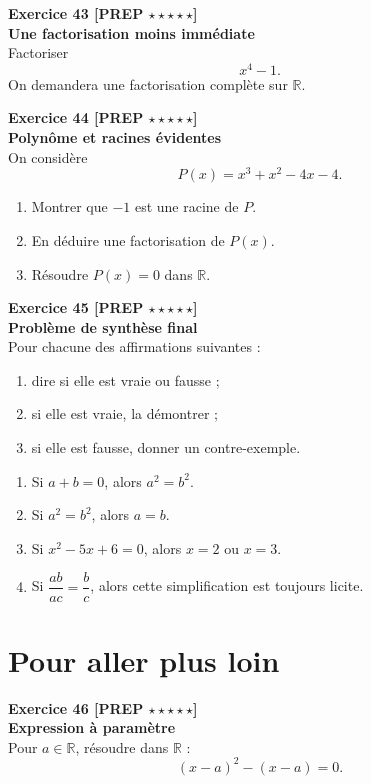\documentclass[11pt,a4paper]{article}
\begin{document}
\textbf{Exercice 43 [PREP $\star\star\star\star\star$]}\\
\textbf{Une factorisation moins immédiate}\\
Factoriser
\[
x^4-1.
\]
On demandera une factorisation complète sur $\mathbb{R}$.

\textbf{Exercice 44 [PREP $\star\star\star\star\star$]}\\
\textbf{Polynôme et racines évidentes}\\
On considère
\[
P(x)=x^3+x^2-4x-4.
\]
\begin{enumerate}[label=\alph*)]
    \item Montrer que $-1$ est une racine de $P$.
    \item En déduire une factorisation de $P(x)$.
    \item Résoudre $P(x)=0$ dans $\mathbb{R}$.
\end{enumerate}

\textbf{Exercice 45 [PREP $\star\star\star\star\star$]}\\
\textbf{Problème de synthèse final}\\
Pour chacune des affirmations suivantes :
\begin{enumerate}[label=\alph*)]
    \item dire si elle est vraie ou fausse ;
    \item si elle est vraie, la démontrer ;
    \item si elle est fausse, donner un contre-exemple.
\end{enumerate}

\begin{enumerate}[label=\arabic*)]
    \item Si $a+b=0$, alors $a^2=b^2$.
    \item Si $a^2=b^2$, alors $a=b$.
    \item Si $x^2-5x+6=0$, alors $x=2$ ou $x=3$.
    \item Si $\dfrac{ab}{ac}=\dfrac{b}{c}$, alors cette simplification est toujours licite.
\end{enumerate}

\newpage

\section*{Pour aller plus loin}

\textbf{Exercice 46 [PREP $\star\star\star\star\star$]}\\
\textbf{Expression à paramètre}\\
Pour $a\in\mathbb{R}$, résoudre dans $\mathbb{R}$ :
\[
(x-a)^2-(x-a)=0.
\]
\end{document}
